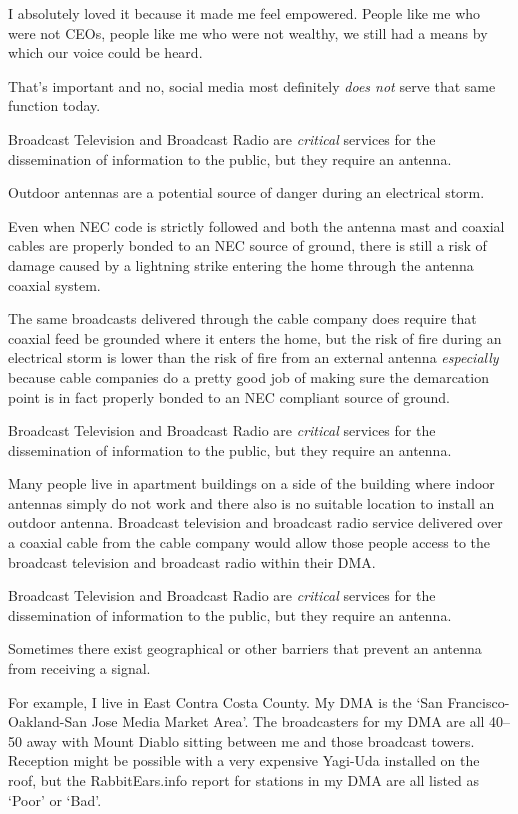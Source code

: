 I absolutely loved it because it made me feel empowered. People like me who were not CEOs, people
like me who were not wealthy, we still had a means by which our voice could be heard.

That's important and no, social media most definitely \emph{does not} serve that same function
today.

Broadcast Television and Broadcast Radio are \emph{critical} services for the dissemination of
information to the public, but they require an antenna.

Outdoor antennas are a potential source of danger during an electrical storm.

Even when NEC code is strictly followed and both the antenna mast and coaxial cables are properly
bonded to an NEC source of ground, there is still a risk of damage caused by a lightning strike
entering the home through the antenna coaxial system.

The same broadcasts delivered through the cable company does require that coaxial feed be grounded
where it enters the home, but the risk of fire during an electrical storm is lower than the risk
of fire from an external antenna \emph{especially} because cable companies do a pretty good job of
making sure the demarcation point is in fact properly bonded to an NEC compliant source of ground.

Broadcast Television and Broadcast Radio are \emph{critical} services for the dissemination of
information to the public, but they require an antenna.

Many people live in apartment buildings on a side of the building where indoor antennas simply
do not work and there also is no suitable location to install an outdoor antenna. Broadcast
television and broadcast radio service delivered over a coaxial cable from the cable company
would allow those people access to the broadcast television and broadcast radio within their
DMA.

Broadcast Television and Broadcast Radio are \emph{critical} services for the dissemination of
information to the public, but they require an antenna.

Sometimes there exist geographical or other barriers that prevent an antenna from receiving
a signal.

For example, I live in East Contra Costa County. My DMA is the `San Francisco-Oakland-San Jose
Media Market Area'. The broadcasters for my DMA are all \SIrange{40}{50}{\mile} away with
Mount Diablo sitting between me and those broadcast towers. Reception might be possible with
a very expensive Yagi-Uda installed on the roof, but the RabbitEars.info report for stations
in my DMA are all listed as `Poor' or `Bad'.

